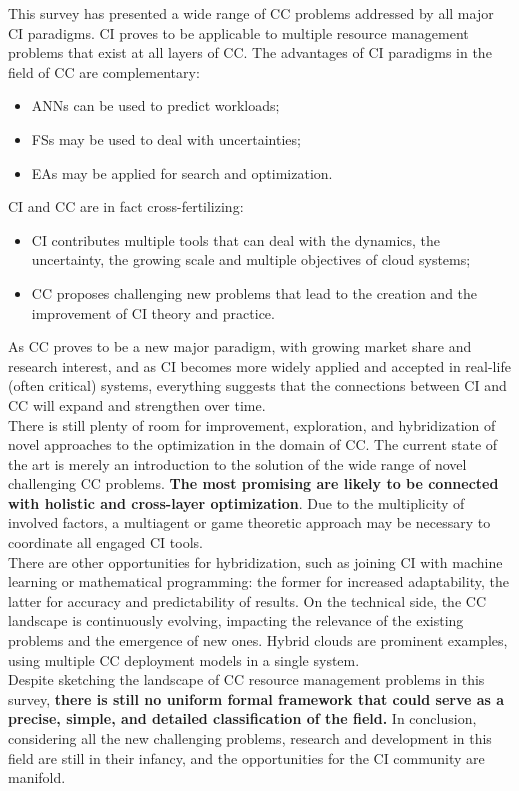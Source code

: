 This survey has presented a wide range of CC problems addressed by all major CI paradigms. 
CI proves to be applicable to multiple resource management problems that exist at all layers of CC.
The advantages of CI paradigms in the field of CC are complementary: 
\begin{itemize}
    \item ANNs can be used to predict workloads;
    \item FSs may be used to deal with uncertainties;
    \item EAs may be applied for search and optimization.
\end{itemize}
CI and CC are in fact cross-fertilizing: 
\begin{itemize}
    \item CI contributes multiple tools that can deal with the dynamics, the uncertainty, the
    growing scale and multiple objectives of cloud systems;
    \item CC proposes challenging new problems that lead to the creation and the improvement of CI theory and practice.
\end{itemize}
As CC proves to be a new major paradigm, with growing market share and
research interest, and as CI becomes more widely applied and accepted in real-life
(often critical) systems, everything suggests that the connections between CI and CC will expand and strengthen over time. \\
There is still plenty of room for improvement, exploration, and hybridization of novel approaches to the optimization in the domain of CC.
The current state of the art is merely an introduction to the solution of the wide range of novel challenging CC problems. 
\textbf{The most promising are likely to be connected with holistic and cross-layer optimization}. 
Due to the multiplicity of involved factors, a multiagent or game theoretic approach may
be necessary to coordinate all engaged CI tools. \\
There are other opportunities for hybridization, such as joining CI with machine learning or mathematical programming: 
the former for increased adaptability, the latter for accuracy and predictability of results. 
On the technical side, the CC landscape is continuously evolving, impacting the relevance
of the existing problems and the emergence of new ones. 
Hybrid clouds are prominent examples, using multiple CC deployment models in a single system.\\
Despite sketching the landscape of CC resource management problems in this survey, 
\textbf{there is still no uniform formal framework that could serve as a precise, simple, and detailed classification of the field.} 
In conclusion, considering all the new challenging problems, research and development in this field are still in their
infancy, and the opportunities for the CI community are manifold.

